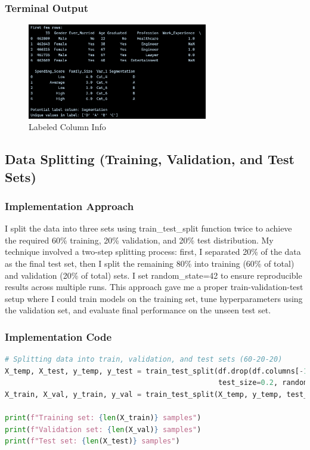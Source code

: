 \documentclass[12pt,a4paper]{article}
\begin{document}
\newpage
\subsubsection{Terminal Output}
\begin{figure}[h!]
    \centering
    \includegraphics[width=0.70\textwidth]{Figures/label_column_info.png}
    \caption{Labeled Column Info}
\end{figure}

\subsection{Data Splitting (Training, Validation, and Test Sets)}

\subsubsection{Implementation Approach}
I split the data into three sets using train\_test\_split function twice to achieve the required 60\% training, 20\% validation, and 20\% test distribution. My technique involved a two-step splitting process: first, I separated 20\% of the data as the final test set, then I split the remaining 80\% into training (60\% of total) and validation (20\% of total) sets. I set random\_state=42 to ensure reproducible results across multiple runs. This approach gave me a proper train-validation-test setup where I could train models on the training set, tune hyperparameters using the validation set, and evaluate final performance on the unseen test set.

\subsubsection{Implementation Code}
\begin{lstlisting}[language=Python, caption={Data Splitting into Training Validation and Test Sets}]
# Splitting data into train, validation, and test sets (60-20-20)
X_temp, X_test, y_temp, y_test = train_test_split(df.drop(df.columns[-1], axis=1), df[df.columns[-1]], 
                                                  test_size=0.2, random_state=42)
X_train, X_val, y_train, y_val = train_test_split(X_temp, y_temp, test_size=0.25, random_state=42)

print(f"Training set: {len(X_train)} samples")
print(f"Validation set: {len(X_val)} samples")
print(f"Test set: {len(X_test)} samples")
\end{lstlisting}
\end{document}
